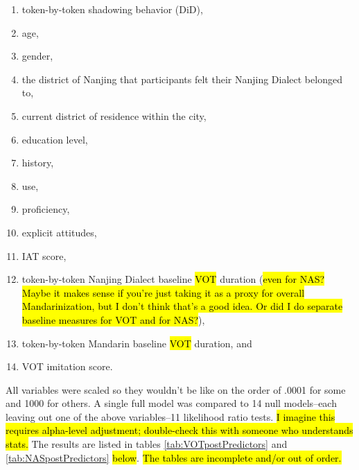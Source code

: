 \begin{enumerate}
    \item token-by-token shadowing behavior (DiD),
    \item age,
    \item gender,
    \item the district of Nanjing that participants felt their Nanjing Dialect belonged to,
    \item current district of residence within the city,
    \item education level,
    \item history,
    \item use,
    \item proficiency,
    \item explicit attitudes,
    \item IAT score,
    \item token-by-token Nanjing Dialect baseline \hl{VOT} duration (\hl{even for NAS? Maybe it makes sense if you're just taking it as a proxy for overall Mandarinization, but I don't think that's a good idea. Or did I do separate baseline measures for VOT and for NAS?}),
    \item token-by-token Mandarin baseline \hl{VOT} duration, and
    \item VOT imitation score.
\end{enumerate}
All variables were scaled so they wouldn't be like on the order of .0001 for some and 1000 for others. A single full model was compared to 14 null models--each leaving out one of the above variables--11 likelihood ratio tests. \hl{I imagine this requires alpha-level adjustment; double-check this with someone who understands stats.} The results are listed in tables \ref{tab:VOTpostPredictors} and \ref{tab:NASpostPredictors} \hl{below}. \hl{The tables are incomplete and/or out of order.}

